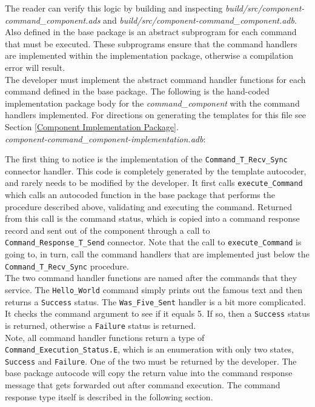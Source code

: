 The reader can verify this logic by building and inspecting \textit{build/src/component-command\_component.ads} and \textit{build/src/component-command\_component.adb}. \\

Also defined in the base package is an abstract subprogram for each command that must be executed. These subprograms ensure that the command handlers are implemented within the implementation package, otherwise a compilation error will result. \\

The developer must implement the abstract command handler functions for each command defined in the base package. The following is the hand-coded implementation package body for the \textit{command\_component} with the command handlers implemented. For directions on generating the templates for this file see Section \ref{Component Implementation Package}. \\

\textit{component-command\_component-implementation.adb}:

The first thing to notice is the implementation of the \texttt{Command\_T\_Recv\_Sync} connector handler. This code is completely generated by the template autocoder, and rarely needs to be modified by the developer. It first calls \texttt{execute\_Command} which calls an autocoded function in the base package that performs the procedure described above, validating and executing the command. Returned from this call is the command status, which is copied into a command response record and sent out of the component through a call to \texttt{Command\_Response\_T\_Send} connector. Note that the call to \texttt{execute\_Command} is going to, in turn, call the command handlers that are implemented just below the \texttt{Command\_T\_Recv\_Sync} procedure. \\

The two command handler functions are named after the commands that they service. The \texttt{Hello\_World} command simply prints out the famous text and then returns a \texttt{Success} status. The \texttt{Was\_Five\_Sent} handler is a bit more complicated. It checks the command argument to see if it equals 5. If so, then a \texttt{Success} status is returned, otherwise a \texttt{Failure} status is returned. \\

Note, all command handler functions return a type of \texttt{Command\_Execution\_Status.E}, which is an enumeration with only two states, \texttt{Success} and \texttt{Failure}. One of the two must be returned by the developer. The base package autocode will copy the return value into the command response message that gets forwarded out after command execution. The command response type itself is described in the following section. \\

